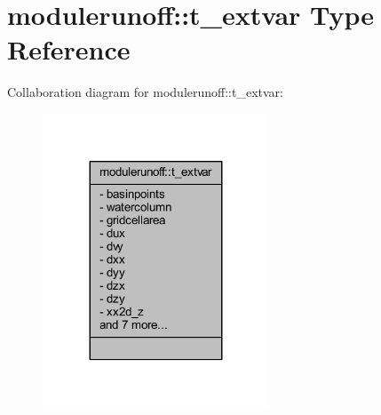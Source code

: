 \hypertarget{structmodulerunoff_1_1t__extvar}{}\section{modulerunoff\+:\+:t\+\_\+extvar Type Reference}
\label{structmodulerunoff_1_1t__extvar}


Collaboration diagram for modulerunoff\+:\+:t\+\_\+extvar\+:\nopagebreak
\begin{figure}[H]
\begin{center}
\leavevmode
\includegraphics[width=191pt]{structmodulerunoff_1_1t__extvar__coll__graph}
\end{center}
\end{figure}
